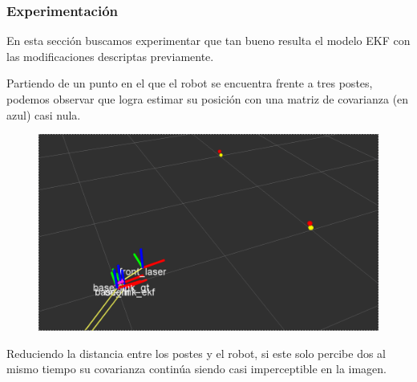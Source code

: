 

\subsubsection{Experimentación}

En esta sección buscamos experimentar que tan bueno resulta el modelo EKF con las modificaciones descriptas previamente.

Partiendo de un punto en el que el robot se encuentra frente a tres postes, podemos observar que logra estimar su posición con una matriz de covarianza (en azul) casi nula.

\begin{figure}[!htb]
\begin{center}
\includegraphics[scale=0.3]{punto4/ekfViendoTodosLosPostes.png}
\end{center}
\end{figure}
\FloatBarrier

\FloatBarrier

Reduciendo la distancia entre los postes y el robot, si este solo percibe dos al mismo tiempo su covarianza continúa siendo casi imperceptible en la imagen.

